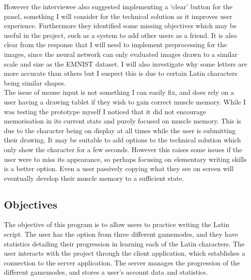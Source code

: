 \documentclass{article}
\begin{document}
However the interviewee also suggested implementing a `clear' button for the panel, something I will consider for the technical solution as it improves user experience. Furthermore they identified some missing objectives which may be useful in the project, such as a system to add other users as a friend. It is also clear from the response that I will need to implement preprocessing for the images, since the neural network can only evaluated images drawn to a similar scale and size as the EMNIST dataset. I will also investigate why some letters are more accurate than others but I suspect this is due to certain Latin characters being similar shapes. \\

The issue of mouse input is not something I can easily fix, and does rely on a user having a drawing tablet if they wish to gain correct muscle memory. While I was testing the prototype myself I noticed that it did not encourage memorisation in its current state and purely focused on muscle memory. This is due to the character being on display at all times while the user is submitting their drawing. It may be suitable to add options to the technical solution which only show the character for a few seconds. However this raises some issues if the user were to miss its appearance, so perhaps focusing on elementary writing skills is a better option. Even a user passively copying what they see on screen will eventually develop their muscle memory to a sufficient state.

\newpage
\subsection{Objectives}
The objective of this program is to allow users to practice writing the Latin script. The user has the option from three different gamemodes, and they have statistics detailing their progression in learning each of the Latin characters. The user interacts with the project through the client application, which establishes a connection to the server application. The server manages the progression of the different gamemodes, and stores a user's account data and statistics.
\end{document}
